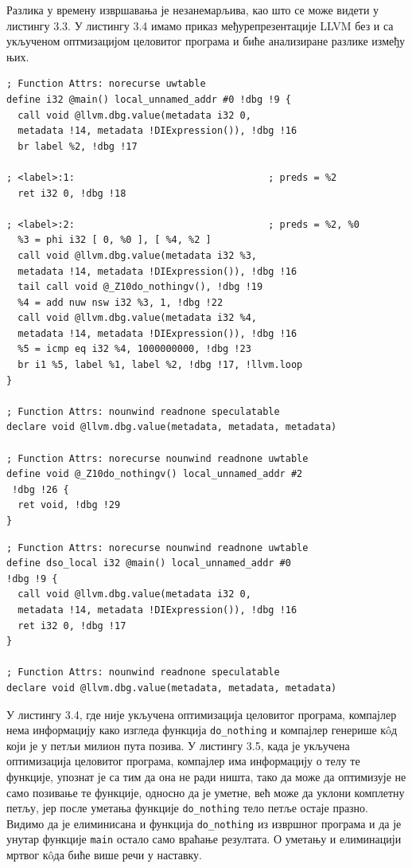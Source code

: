 \documentclass[12pt,oneside]{memoir}
\begin{document}
Разлика у времену извршавања је незанемарљива, као што се може видети у листингу 3.3.
У листингу 3.4 имамо приказ међурепрезентације LLVM  без и са укљученом оптмизацијом целовитог програма
и биће анализиране разлике између њих.
\begin{lstlisting}[frame=single, caption={Међурепрезентација без оптимизације целовитог програма}, captionpos=b]
; Function Attrs: norecurse uwtable
define i32 @main() local_unnamed_addr #0 !dbg !9 {
  call void @llvm.dbg.value(metadata i32 0, 
  metadata !14, metadata !DIExpression()), !dbg !16
  br label %2, !dbg !17

; <label>:1:                                  ; preds = %2
  ret i32 0, !dbg !18

; <label>:2:                                  ; preds = %2, %0
  %3 = phi i32 [ 0, %0 ], [ %4, %2 ]
  call void @llvm.dbg.value(metadata i32 %3, 
  metadata !14, metadata !DIExpression()), !dbg !16
  tail call void @_Z10do_nothingv(), !dbg !19
  %4 = add nuw nsw i32 %3, 1, !dbg !22
  call void @llvm.dbg.value(metadata i32 %4,
  metadata !14, metadata !DIExpression()), !dbg !16
  %5 = icmp eq i32 %4, 1000000000, !dbg !23
  br i1 %5, label %1, label %2, !dbg !17, !llvm.loop
}

; Function Attrs: nounwind readnone speculatable
declare void @llvm.dbg.value(metadata, metadata, metadata)

; Function Attrs: norecurse nounwind readnone uwtable
define void @_Z10do_nothingv() local_unnamed_addr #2 
 !dbg !26 {
  ret void, !dbg !29
}
\end{lstlisting}


\begin{lstlisting}[frame=single, caption={Међурепрезентација са оптимизацијом целовитог програма}, captionpos=b]
; Function Attrs: norecurse nounwind readnone uwtable
define dso_local i32 @main() local_unnamed_addr #0 
!dbg !9 {
  call void @llvm.dbg.value(metadata i32 0, 
  metadata !14, metadata !DIExpression()), !dbg !16
  ret i32 0, !dbg !17
}

; Function Attrs: nounwind readnone speculatable
declare void @llvm.dbg.value(metadata, metadata, metadata)

\end{lstlisting}

У листингу 3.4, где није укључена оптимизација целовитог програма, компајлер нема информацију  како
изгледа функција \texttt{do{\_}nothing} и компајлер генерише к\^{o}д који је у петљи милион пута позива.
У листингу 3.5, када је укључена оптимизација целовитог програма, компајлер има информацију о телу те функције,
упознат је са тим да она не ради ништа, тако да може да оптимизује не само позивање те функције,
односно да је уметне, већ може да уклони комплетну петљу, јер после уметања
функције \texttt{do{\_}nothing} тело петље остаје празно.
Видимо да је елиминисана и функција \texttt{do{\_}nothing} из извршног програма и да је унутар
функције \texttt{main} остало само враћање резултата.
О уметању и елиминацији мртвог к\^{o}да биће више речи у наставку.
\end{document}
